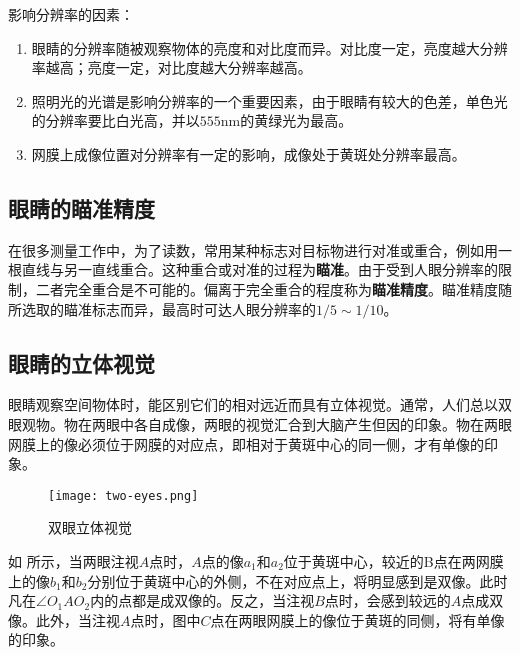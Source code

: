 \documentclass[cn,10pt,chinesefont=founder,math=mtpro2,cite=super,toc=onecol,twoside,openany]{elegantbook}
\begin{document}
\begin{note}
	影响分辨率的因素：
	\begin{enumerate}
		\item 眼睛的分辨率随被观察物体的亮度和对比度而异。对比度一定，亮度越大分辨率越高；亮度一定，对比度越大分辨率越高。
		\item 照明光的光谱是影响分辨率的一个重要因素，由于眼睛有较大的色差，单色光的分辨率要比白光高，并以$555$nm的黄绿光为最高。
		\item 网膜上成像位置对分辨率有一定的影响，成像处于黄斑处分辨率最高。
	\end{enumerate}
\end{note}

\subsection{眼睛的瞄准精度}
在很多测量工作中，为了读数，常用某种标志对目标物进行对准或重合，例如用一根直线与另一直线重合。这种重合或对准的过程为\textbf{瞄准}。由于受到人眼分辨率的限制，二者完全重合是不可能的。偏离于完全重合的程度称为\textbf{瞄准精度}。瞄准精度随所选取的瞄准标志而异，最高时可达人眼分辨率的$1/5\sim1/10$。

\subsection{眼睛的立体视觉}
眼睛观察空间物体时，能区别它们的相对远近而具有立体视觉。通常，人们总以双眼观物。物在两眼中各自成像，两眼的视觉汇合到大脑产生但因的印象。物在两眼网膜上的像必须位于网膜的对应点，即相对于黄斑中心的同一侧，才有单像的印象。

\begin{figure}[htbp]
	\centering
	\texttt{[image: two-eyes.png]}
	\caption{双眼立体视觉}
	\label{fig:two-eyes}
\end{figure}

如 所示，当两眼注视$A$点时，$A$点的像$a_1$和$a_2$位于黄斑中心，较近的B点在两网膜上的像$b_1$和$b_2$分别位于黄斑中心的外侧，不在对应点上，将明显感到是双像。此时凡在$\angle O_1AO_2$内的点都是成双像的。反之，当注视$B$点时，会感到较远的$A$点成双像。此外，当注视$A$点时，图中$C$点在两眼网膜上的像位于黄斑的同侧，将有单像的印象。
\end{document}
